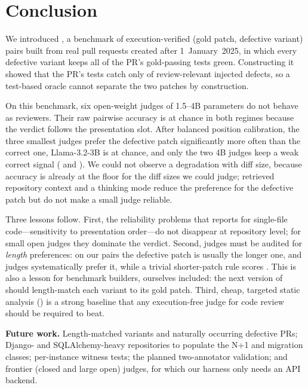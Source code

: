 \section{Conclusion}
\label{sec:conclusion}

We introduced \RJB{}, a benchmark of \NPairs{} execution-verified
(gold patch, defective variant) pairs built from real pull requests created
after 1~January~2025, in which every defective variant keeps all of the PR's
gold-passing tests green.  Constructing it showed that the PR's tests catch only
\TestCatchRate{} of review-relevant injected defects, so a test-based oracle
cannot separate the two patches by construction.

On this benchmark, six open-weight judges of 1.5--4B parameters do not
behave as reviewers.  Their raw pairwise accuracy is at chance in both regimes
because the verdict follows the presentation slot.  After balanced position
calibration, the three smallest judges prefer the defective patch
significantly more often than the correct one, Llama-3.2-3B is at chance, and
only the two 4B judges keep a weak correct signal (\CalRQwenM{} and
\CalRGemma{}).  We could not observe a degradation with diff size, because
accuracy is already at the floor for the diff sizes we could judge; retrieved
repository context and a thinking mode reduce the preference for the
defective patch but do not make a small judge reliable.

Three lessons follow.  First, the reliability problems that \CJB{} reports for
single-file code---sensitivity to presentation order---do not disappear at
repository level; for small open judges they dominate the verdict.  Second,
judges must be audited for \emph{length} preferences: on our pairs the
defective patch is usually the longer one, and judges systematically prefer it,
while a trivial shorter-patch rule scores \LengthHeurAcc{}.  This is also a
lesson for benchmark builders, ourselves included: the next version of
\RJB{} should length-match each variant to its gold patch.  Third, cheap,
targeted static analysis (\StaticRelAcc{}) is a strong baseline that any
execution-free judge for code review should be required to beat.

\textbf{Future work.}  Length-matched variants and naturally occurring
defective PRs; Django- and SQLAlchemy-heavy repositories to populate the N+1
and migration classes; per-instance witness tests; the planned two-annotator
validation; and frontier (closed and large open) judges, for which our harness
only needs an API backend.

